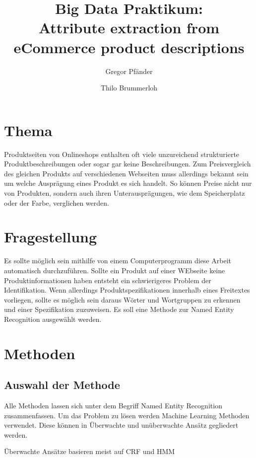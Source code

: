 \documentclass[paper=a4,12pt,listof=totoc]{scrartcl}%
\title{Big Data Praktikum: \\ Attribute extraction from eCommerce product descriptions}
\author{Gregor Pfänder 
\and Thilo Brummerloh}
\begin{document}
	\maketitle
	
	\section{Thema}
	Produktseiten von Onlineshops enthalten oft viele unzureichend strukturierte Produktbeschreibungen oder sogar gar keine Beschreibungen. Zum Preisvergleich des gleichen Produkts auf verschiedenen Webseiten muss allerdings bekannt sein um welche Ausprägung eines Produkt es sich handelt. So können Preise nicht nur von Produkten, sondern auch ihren Unterausprägungen, wie dem Speicherplatz oder der Farbe, verglichen werden.
	
	\section{Fragestellung}
	Es sollte möglich sein mithilfe von einem Computerprogramm diese Arbeit automatisch durchzuführen. Sollte ein Produkt auf einer WEbseite keine Produktinformationen haben entsteht ein schwierigeres Problem der Identifikation. Wenn allerdings Produktspezifikationen innerhalb eines Freitextes vorliegen, sollte es möglich sein daraus Wörter und Wortgruppen zu erkennen und einer Spezifikation zuzuweisen.
	Es soll eine Methode zur Named Entity Recognition ausgewählt werden.
	
	
	\section{Methoden}
	\subsection{Auswahl der Methode}
	Alle Methoden lassen sich unter dem Begriff Named Entity Recognition zusammenfassen. Um das Problem zu lösen werden Machine Learning Methoden verwendet. Diese können in Überwachte und unüberwachte Ansätz gegliedert werden.
	
	Überwachte Ansätze basieren meist auf CRF und HMM
	
\end{document}
